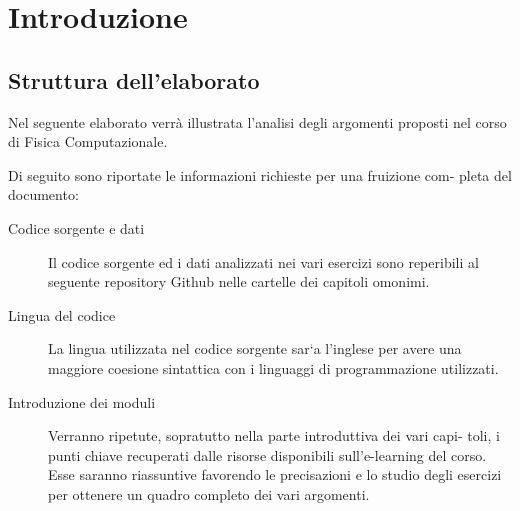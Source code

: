 \setchapterpreamble[u]{\margintoc}
\chapter{Introduzione}

\section{Struttura dell'elaborato}

Nel seguente elaborato verrà illustrata l’analisi degli argomenti proposti nel
corso di Fisica Computazionale.

Di seguito sono riportate le informazioni richieste per una fruizione com-
pleta del documento:

\begin{description}
	\item[Codice sorgente e dati] Il codice sorgente ed i dati analizzati nei vari esercizi sono reperibili al
		seguente repository Github nelle cartelle dei capitoli omonimi.

	\item[Lingua del codice] La lingua utilizzata nel codice sorgente sar`a l’inglese per avere una
		maggiore coesione sintattica con i linguaggi di programmazione utilizzati.
	\item[Introduzione dei moduli] Verranno ripetute, sopratutto nella parte introduttiva dei vari capi-
		toli, i punti chiave recuperati dalle risorse disponibili sull’e-learning del
		corso. Esse saranno riassuntive favorendo le precisazioni e lo studio
		degli esercizi per ottenere un quadro completo dei vari argomenti.
\end{description}

